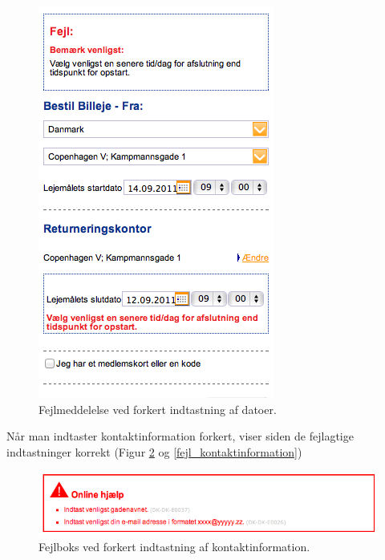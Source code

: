 \documentclass[a4paper]{article}
\begin{document}
\begin{figure}[htbp]
  \begin{center}
    \includegraphics[scale=.6]{6.png}
  \end{center}
  \caption{Fejlmeddelelse ved forkert indtastning af datoer.}
  \label{fejl_datoer}
\end{figure}

Når man indtaster kontaktinformation forkert, viser siden de fejlagtige
indtastninger korrekt (Figur \ref{fejl_boks} og \ref{fejl_kontaktinformation})

\begin{figure}[htbp]
  \begin{center}
    \includegraphics[scale=.6]{10.png}
  \end{center}
  \caption{Fejlboks ved forkert indtastning af kontaktinformation.}
  \label{fejl_boks}
\end{figure}
\end{document}
